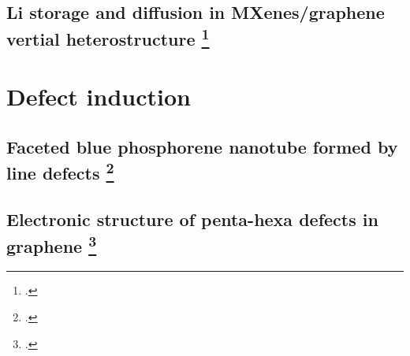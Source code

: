 \subsection[Li storage and diffusion in MXenes/graphene vertial heterostructure]{Li storage and diffusion in MXenes/graphene vertial heterostructure \footcite[This work will be published as:][]{Aierken2017.battery}}

\section{Defect induction}
\subsection[Faceted blue phosphorene nanotube formed by line defects]{Faceted blue phosphorene nanotube formed by line defects \footcite[This work is published in:][]{Aierken2015.nanotubes}}
\subsection[Electronic structure of penta-hexa defects in graphene]{Electronic structure of penta-hexa defects in graphene \footcite[This work is published in:][]{Aierken2016.magnetism}}